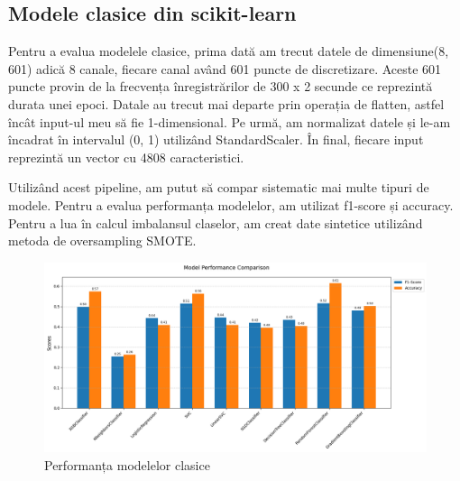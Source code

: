 \subsection{Modele clasice din scikit-learn}
Pentru a evalua modelele clasice, prima dată am trecut datele de dimensiune(8, 601) adică 8 canale, fiecare canal având 601 puncte de discretizare. Aceste 601 puncte provin de la frecvența înregistrărilor de 300 x 2 secunde ce reprezintă durata unei epoci. Datale au trecut mai departe prin operația de flatten, astfel încât input-ul meu să fie 1-dimensional. Pe urmă, am normalizat datele și le-am încadrat în intervalul (0, 1) utilizând StandardScaler. În final, fiecare input reprezintă un vector cu 4808 caracteristici.


Utilizând acest pipeline, am putut să compar sistematic mai multe tipuri de modele. Pentru a evalua performanța modelelor, am utilizat f1-score și accuracy. Pentru a lua în calcul imbalansul claselor, am creat date sintetice utilizând metoda de oversampling SMOTE. %

\vspace{1em}
\begin{figure}[h]
    \centering
    \includegraphics[width=1\textwidth]{images/comparatie_modele_clasice_unweighted.png}
    \caption{Performanța modelelor clasice}
    \label{fig:enter-label}
\end{figure}


